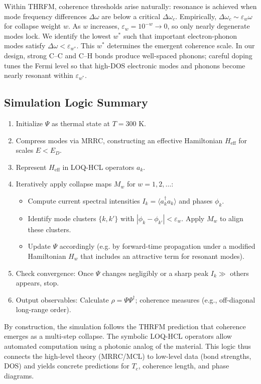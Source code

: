 \documentclass[11pt,a4paper]{article}
\begin{document}
Within THRFM, coherence thresholds arise naturally: resonance is achieved when mode frequency differences $\Delta\omega$ are below a critical $\Delta\omega_c$. Empirically, $\Delta\omega_c \sim \varepsilon_w \omega$ for collapse weight $w$. As $w$ increases, $\varepsilon_w = 10^{-w} \to 0$, so only nearly degenerate modes lock. We identify the lowest $w^*$ such that important electron-phonon modes satisfy $\Delta\omega < \varepsilon_{w^*}$. This $w^*$ determines the emergent coherence scale. In our design, strong C–C and C–H bonds produce well-spaced phonons; careful doping tunes the Fermi level so that high-DOS electronic modes and phonons become nearly resonant within $\varepsilon_{w^*}$.

\subsection{Simulation Logic Summary}
\label{subsec:simulation_logic_summary_detailed}
\begin{enumerate}
\item Initialize $\Psi$ as thermal state at $T=300$ K.
\item Compress modes via MRRC, constructing an effective Hamiltonian $H_{\text{eff}}$ for scales $E < E_D$.
\item Represent $H_{\text{eff}}$ in LOQ-HCL operators $a_k$.
\item Iteratively apply collapse maps $M_w$ for $w=1,2,\dots$:
\begin{itemize}
\item Compute current spectral intensities $I_k = \langle a_k^\dagger a_k \rangle$ and phases $\phi_k$.
\item Identify mode clusters $\{k,k'\}$ with $|\phi_k-\phi_{k'}| < \varepsilon_w$. Apply $M_w$ to align these clusters.
\item Update $\Psi$ accordingly (e.g. by forward-time propagation under a modified Hamiltonian $H_w$ that includes an attractive term for resonant modes).
\end{itemize}
\item Check convergence: Once $\Psi$ changes negligibly or a sharp peak $I_k \gg$ others appears, stop.
\item Output observables: Calculate $\rho = \Psi\Psi^\dagger$; coherence measures (e.g., off-diagonal long-range order).
\end{enumerate}
By construction, the simulation follows the THRFM prediction that coherence emerges as a multi-step collapse. The symbolic LOQ-HCL operators allow automated computation using a photonic analog of the material. This logic thus connects the high-level theory (MRRC/MCL) to low-level data (bond strengths, DOS) and yields concrete predictions for $T_c$, coherence length, and phase diagrams.
\end{document}
